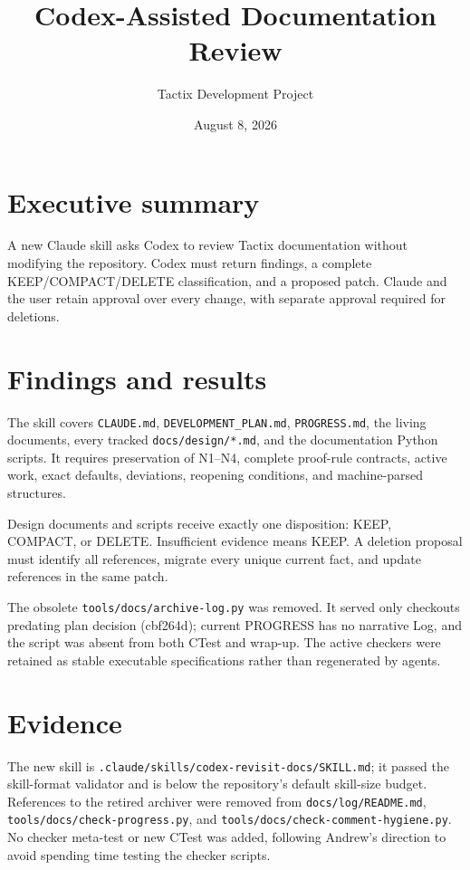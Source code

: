 \documentclass[11pt]{article}
\title{Codex-Assisted Documentation Review}
\author{Tactix Development Project}
\date{August 8, 2026}
\begin{document}
\maketitle

\section*{Executive summary}
A new Claude skill asks Codex to review Tactix documentation without modifying
the repository. Codex must return findings, a complete KEEP/COMPACT/DELETE
classification, and a proposed patch. Claude and the user retain approval over
every change, with separate approval required for deletions.

\section{Findings and results}
The skill covers \texttt{CLAUDE.md}, \texttt{DEVELOPMENT\_PLAN.md},
\texttt{PROGRESS.md}, the living documents, every tracked
\texttt{docs/design/*.md}, and the documentation Python scripts. It requires
preservation of N1--N4, complete proof-rule contracts, active work, exact
defaults, deviations, reopening conditions, and machine-parsed structures.

Design documents and scripts receive exactly one disposition: KEEP, COMPACT,
or DELETE. Insufficient evidence means KEEP. A deletion proposal must identify
all references, migrate every unique current fact, and update references in the
same patch.

The obsolete \texttt{tools/docs/archive-log.py} was removed. It served only
checkouts predating plan decision (cbf264d); current PROGRESS has no narrative Log,
and the script was absent from both CTest and wrap-up. The active checkers were
retained as stable executable specifications rather than regenerated by agents.

\section{Evidence}
The new skill is
\texttt{.claude/skills/codex-revisit-docs/SKILL.md}; it passed the skill-format
validator and is below the repository's default skill-size budget. References
to the retired archiver were removed from \texttt{docs/log/README.md},
\texttt{tools/docs/check-progress.py}, and
\texttt{tools/docs/check-comment-hygiene.py}. No checker meta-test or new CTest
was added, following Andrew's direction to avoid spending time testing the
checker scripts.
\end{document}
